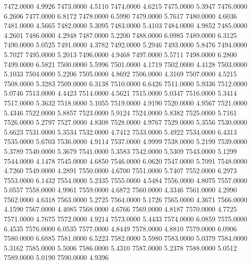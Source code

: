 7472.0000      4.9926
7473.0000      4.5110
7474.0000      4.6215
7475.0000      5.3947
7476.0000      6.2606
7477.0000      6.8172
7478.0000      6.5990
7479.0000      5.7617
7480.0000      4.6036
7481.0000      4.5665
7482.0000      5.3095
7483.0000      5.4103
7484.0000      4.9852
7485.0000      4.2601
7486.0000      4.2948
7487.0000      5.2200
7488.0000      6.0985
7489.0000      6.3125
7490.0000      5.0525
7491.0000      4.3782
7492.0000      5.2946
7493.0000      5.8476
7494.0000      5.7027
7495.0000      5.2013
7496.0000      4.9468
7497.0000      5.5711
7498.0000      6.2800
7499.0000      6.5821
7500.0000      5.5996
7501.0000      4.1719
7502.0000      4.4128
7503.0000      5.1033
7504.0000      5.2206
7505.0000      4.8692
7506.0000      4.3169
7507.0000      4.5215
7508.0000      5.3283
7509.0000      6.3138
7510.0000      6.6426
7511.0000      5.9336
7512.0000      5.0746
7513.0000      4.4423
7514.0000      4.5621
7515.0000      5.0347
7516.0000      5.3414
7517.0000      5.3632
7518.0000      5.1055
7519.0000      4.9190
7520.0000      4.9567
7521.0000      5.4346
7522.0000      5.8857
7523.0000      5.9124
7524.0000      5.8382
7525.0000      5.7161
7526.0000      5.2797
7527.0000      4.8308
7528.0000      4.9767
7529.0000      5.3556
7530.0000      5.6623
7531.0000      5.3534
7532.0000      4.7412
7533.0000      5.4922
7534.0000      6.4313
7535.0000      5.6703
7536.0000      4.9114
7537.0000      4.9999
7538.0000      5.2199
7539.0000      5.3789
7540.0000      5.3679
7541.0000      5.3583
7542.0000      5.5309
7543.0000      5.1299
7544.0000      4.1478
7545.0000      4.6850
7546.0000      6.0620
7547.0000      5.7091
7548.0000      4.7260
7549.0000      4.2891
7550.0000      4.6700
7551.0000      5.7407
7552.0000      6.2973
7553.0000      6.1432
7554.0000      5.2335
7555.0000      4.5484
7556.0000      4.8075
7557.0000      5.0557
7558.0000      4.9961
7559.0000      4.6872
7560.0000      4.3346
7561.0000      4.2990
7562.0000      4.6318
7563.0000      5.2725
7564.0000      5.1726
7565.0000      4.3671
7566.0000      4.1590
7567.0000      4.4085
7568.0000      4.6766
7569.0000      4.8187
7570.0000      4.7725
7571.0000      4.7675
7572.0000      4.9214
7573.0000      5.4433
7574.0000      6.0859
7575.0000      6.4535
7576.0000      6.0535
7577.0000      4.8449
7578.0000      4.8810
7579.0000      6.0906
7580.0000      6.6885
7581.0000      6.5223
7582.0000      5.5980
7583.0000      5.0379
7584.0000      5.3162
7585.0000      5.5006
7586.0000      5.4310
7587.0000      5.2378
7588.0000      5.0512
7589.0000      5.0190
7590.0000      4.9396
